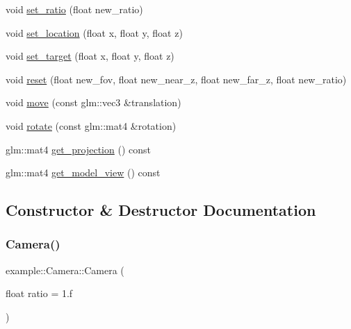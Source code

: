 \begin{DoxyCompactItemize}
\item 
void \mbox{\hyperlink{classexample_1_1_camera_a30aa3059c5ca9c5796b835bc5881dda1}{set\+\_\+ratio}} (float new\+\_\+ratio)
\item 
void \mbox{\hyperlink{classexample_1_1_camera_abcfe34f1adaf8be11c871ae8d9d10385}{set\+\_\+location}} (float x, float y, float z)
\item 
void \mbox{\hyperlink{classexample_1_1_camera_a79232d58b96672593124b28c5c1aafa3}{set\+\_\+target}} (float x, float y, float z)
\item 
void \mbox{\hyperlink{classexample_1_1_camera_a5c8b855f8570626c91bc25f7014fb90e}{reset}} (float new\+\_\+fov, float new\+\_\+near\+\_\+z, float new\+\_\+far\+\_\+z, float new\+\_\+ratio)
\item 
void \mbox{\hyperlink{classexample_1_1_camera_a076f2b136b38a50738827c93712689e4}{move}} (const glm\+::vec3 \&translation)
\item 
void \mbox{\hyperlink{classexample_1_1_camera_af87e314b23ccc6462b27985eb1d648b4}{rotate}} (const glm\+::mat4 \&rotation)
\item 
glm\+::mat4 \mbox{\hyperlink{classexample_1_1_camera_ab30b27febf3449c284eba6bb0d693910}{get\+\_\+projection}} () const
\item 
glm\+::mat4 \mbox{\hyperlink{classexample_1_1_camera_a7e95b2f8f11b40c1ab05def2f1899338}{get\+\_\+model\+\_\+view}} () const
\end{DoxyCompactItemize}


\subsection{Constructor \& Destructor Documentation}
\mbox{\label{classexample_1_1_camera_af7baaae5fda716b71356ce0d36cb5856}} 
\subsubsection{\texorpdfstring{Camera()}{Camera()}\hspace{0.1cm}{\footnotesize\ttfamily [1/3]}}
{\footnotesize\ttfamily example\+::\+Camera\+::\+Camera (\begin{DoxyParamCaption}\item[{float}]{ratio = {\ttfamily 1.f} }\end{DoxyParamCaption})\hspace{0.3cm}{\ttfamily [inline]}}

